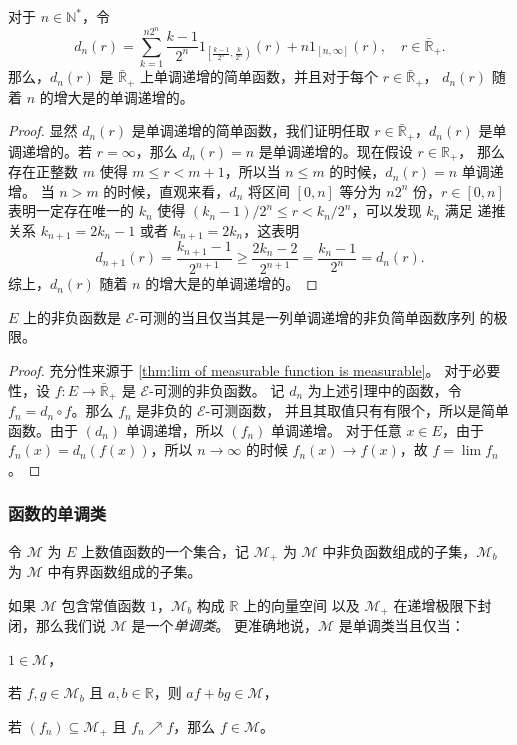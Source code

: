 \documentclass[fontset=none]{Notes}
\begin{document}
\begin{lemma}\label{lemma:dn}
  对于 $n\in \mathbb{N}^*$，令
  \[
    d_n(r)=\sum_{k=1}^{n2^n}\frac{k-1}{2^n}1_{\left[\frac{k-1}{2^n},\frac{k}{2^n}\right)}(r)
    +n1_{[n,\infty]}(r),\quad r\in \bar{\mathbb{R}}_+.
  \]
  那么，$d_n(r)$ 是 $\bar{\mathbb{R}}_+$ 上单调递增的简单函数，并且对于每个 $r\in\bar{\mathbb{R}}_+$，
  $d_n(r)$ 随着 $n$ 的增大是的单调递增的。
\end{lemma}
\begin{proof}
  显然 $d_n(r)$ 是单调递增的简单函数，我们证明任取 $r\in \bar{\mathbb{R}}_+$，$d_n(r)$
  是单调递增的。若 $r=\infty$，那么 $d_n(r)=n$ 是单调递增的。现在假设 $r\in \mathbb{R}_+$，
  那么存在正整数 $m$ 使得 $m\leq r<m+1$，所以当 $n\leq m$ 的时候，$d_n(r)=n$ 单调递增。
  当 $n>m$ 的时候，直观来看，$d_n$ 将区间 $[0,n]$ 等分为 $n2^{n}$ 份，$r\in [0,n]$
  表明一定存在唯一的 $k_n$ 使得 $(k_n-1)/2^n\leq r <k_n/2^n$，可以发现 $k_{n}$ 满足 
  递推关系 $k_{n+1}=2k_n-1$ 或者 $k_{n+1}=2k_n$，这表明
  \[
    d_{n+1}(r)= \frac{k_{n+1}-1}{2^{n+1}}\geq\frac{2k_n-2}{2^{n+1}}=\frac{k_n-1}{2^n}=d_n(r).
  \]
  综上，$d_n(r)$ 随着 $n$ 的增大是的单调递增的。
\end{proof}

\begin{theorem}\label{thm:approximation of measurable function}
  $E$ 上的非负函数是 $\mathcal{E}$-可测的当且仅当其是一列单调递增的非负简单函数序列
  的极限。
\end{theorem}
\begin{proof}
  充分性来源于 \autoref{thm:lim of measurable function is measurable}。
  对于必要性，设 $f:E\to\bar{\mathbb{R}}_+$ 是 $\mathcal{E}$-可测的非负函数。
  记 $d_n$ 为上述引理中的函数，令 $f_n=d_n\circ f$。那么 $f_n$ 是非负的 $\mathcal{E}$-可测函数，
  并且其取值只有有限个，所以是简单函数。由于 $(d_n)$ 单调递增，所以 $(f_n)$ 单调递增。
  对于任意 $x\in E$，由于 $f_n(x)=d_n(f(x))$，所以 $n\to\infty$ 的时候
  $f_n(x)\to f(x)$，故 $f=\lim f_n$。
\end{proof}

\subsubsection{函数的单调类}

令 $\mathcal{M}$ 为 $E$ 上数值函数的一个集合，记 $\mathcal{M}_+$ 为 $\mathcal{M}$
中非负函数组成的子集，$\mathcal{M}_b$ 为 $\mathcal{M}$ 中有界函数组成的子集。

如果 $\mathcal{M}$ 包含常值函数 $1$，$\mathcal{M}_b$ 构成 $\mathbb{R}$ 上的向量空间
以及 $\mathcal{M}_+$ 在递增极限下封闭，那么我们说 $\mathcal{M}$ 是一个\emph{单调类}。
更准确地说，$\mathcal{M}$ 是单调类当且仅当：
\begin{alphenum}
  \item $1\in \mathcal{M}$，
  \item 若 $f,g\in \mathcal{M}_b$ 且 $a,b\in \mathbb{R}$，则 $af+bg\in \mathcal{M}$，
  \item 若 $(f_n)\subseteq \mathcal{M}_+$ 且 $f_n\nearrow f$，那么
  $f\in \mathcal{M}$。
\end{alphenum}
\end{document}
